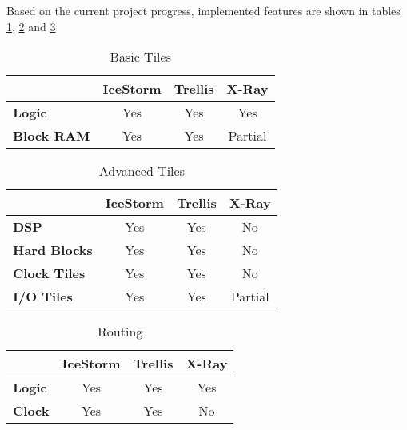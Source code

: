 
Based on the current project progress, implemented features are shown in tables \ref{basic-tiles}, \ref{advanced-tiles} and \ref{routing}

\begin{table}[htp]
\centering
\begin{tabular}{|l|c|c|c|}
\hline
       & \multicolumn{1}{l|}{\textbf{IceStorm}} & \multicolumn{1}{l|}{\textbf{Trellis}} & \multicolumn{1}{l|}{\textbf{X-Ray}} \\ \hline
\textbf{Logic}     & Yes     & Yes & Yes \\ \hline
\textbf{Block RAM} & Yes & Yes & Partial \\ \hline
\end{tabular}
\caption{Basic Tiles}
\label{basic-tiles}
\end{table}


\begin{table}[htp]
\centering
\begin{tabular}{|l|c|c|c|}
\hline
                     & \multicolumn{1}{l|}{\textbf{IceStorm}} & \multicolumn{1}{l|}{\textbf{Trellis}} & \multicolumn{1}{l|}{\textbf{X-Ray}} \\ \hline
\textbf{DSP}         & Yes                                    & Yes                                   & No                                  \\ \hline
\textbf{Hard Blocks} & Yes                                    & Yes                                   & No                                  \\ \hline
\textbf{Clock Tiles} & Yes                                    & Yes                                   & No                                  \\ \hline
\textbf{I/O Tiles}   & Yes                                    & Yes                                   & Partial                             \\ \hline
\end{tabular}
\caption{Advanced Tiles}
\label{advanced-tiles}
\end{table}


\begin{table}[htp]
\centering
\begin{tabular}{|l|c|c|c|}
\hline
       & \multicolumn{1}{l|}{\textbf{IceStorm}} & \multicolumn{1}{l|}{\textbf{Trellis}} & \multicolumn{1}{l|}{\textbf{X-Ray}} \\ \hline
\textbf{Logic}     & Yes     & Yes & Yes \\ \hline
\textbf{Clock} & Yes & Yes & No \\ \hline
\end{tabular}
\caption{Routing}
\label{routing}
\end{table}